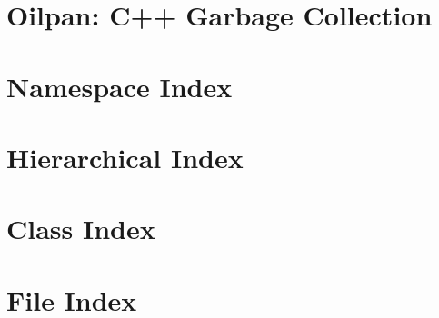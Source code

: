 \let\mypdfximage\pdfximage\def\pdfximage{\immediate\mypdfximage}\documentclass[twoside]{book}
\newcommand{\+}{\discretionary{\mbox{\scriptsize$\hookleftarrow$}}{}{}}
\begin{document}
\chapter{Oilpan\+: C++ Garbage Collection}
\label{md__mnt_V8SourceCode_include_cppgc_README}

\chapter{Namespace Index}

\chapter{Hierarchical Index}

\chapter{Class Index}

\chapter{File Index}

\end{document}

